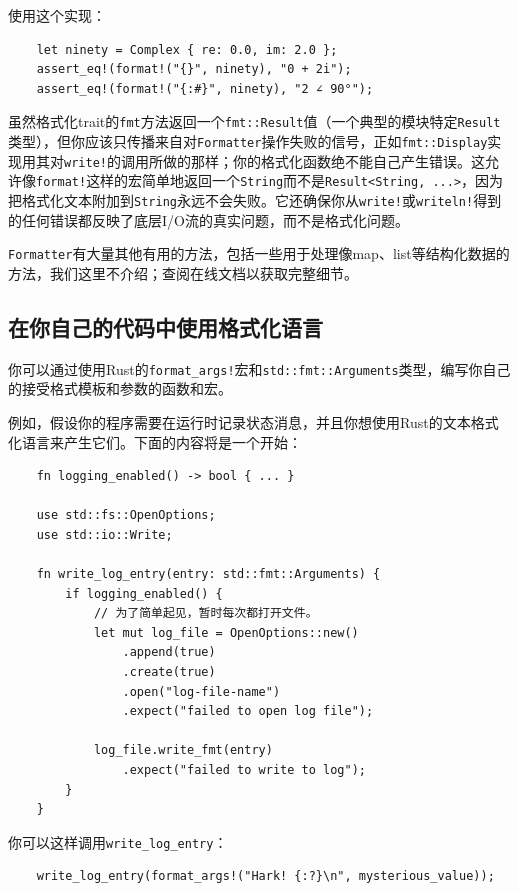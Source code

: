 使用这个实现：
\begin{verbatim}
    let ninety = Complex { re: 0.0, im: 2.0 };
    assert_eq!(format!("{}", ninety), "0 + 2i");
    assert_eq!(format!("{:#}", ninety), "2 ∠ 90°");
\end{verbatim}

虽然格式化trait的\texttt{fmt}方法返回一个\texttt{fmt::Result}值（一个典型的模块特定\texttt{Result}类型），但你应该只传播来自对\texttt{Formatter}操作失败的信号，正如\texttt{fmt::Display}实现用其对\texttt{write!}的调用所做的那样；你的格式化函数绝不能自己产生错误。这允许像\texttt{format!}这样的宏简单地返回一个\texttt{String}而不是\texttt{Result<String, ...>}，因为把格式化文本附加到\texttt{String}永远不会失败。它还确保你从\texttt{write!}或\texttt{writeln!}得到的任何错误都反映了底层I/O流的真实问题，而不是格式化问题。

\texttt{Formatter}有大量其他有用的方法，包括一些用于处理像map、list等结构化数据的方法，我们这里不介绍；查阅在线文档以获取完整细节。

\subsection{在你自己的代码中使用格式化语言}

你可以通过使用Rust的\texttt{format\_args!}宏和\texttt{std::fmt::Arguments}类型，编写你自己的接受格式模板和参数的函数和宏。

例如，假设你的程序需要在运行时记录状态消息，并且你想使用Rust的文本格式化语言来产生它们。下面的内容将是一个开始：
\begin{verbatim}
    fn logging_enabled() -> bool { ... }

    use std::fs::OpenOptions;
    use std::io::Write;

    fn write_log_entry(entry: std::fmt::Arguments) {
        if logging_enabled() {
            // 为了简单起见，暂时每次都打开文件。
            let mut log_file = OpenOptions::new()
                .append(true)
                .create(true)
                .open("log-file-name")
                .expect("failed to open log file");

            log_file.write_fmt(entry)
                .expect("failed to write to log");
        }
    }
\end{verbatim}

你可以这样调用\texttt{write\_log\_entry}：
\begin{verbatim}
    write_log_entry(format_args!("Hark! {:?}\n", mysterious_value));
\end{verbatim}

